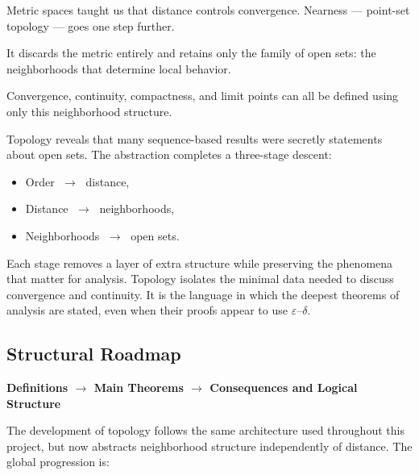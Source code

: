 \begin{tcolorbox}[
  colback=gray!6,
  colframe=gray!40,
  arc=2pt,
  left=8pt, right=8pt, top=6pt, bottom=6pt,
  title={\small\textbf{Structural Role: Nearness — Neighborhood Structure Without Distance}},
  fonttitle=\small\bfseries
]
Metric spaces taught us that distance controls convergence.
Nearness --- point-set topology --- goes one step further.

It discards the metric entirely
and retains only the family of open sets:
the neighborhoods that determine local behavior.

Convergence, continuity, compactness, and limit points
can all be defined using only this neighborhood structure.

Topology reveals that many sequence-based results
were secretly statements about open sets.
The abstraction completes a three-stage descent:

\begin{itemize}
  \item Order $\;\to\;$ distance,
  \item Distance $\;\to\;$ neighborhoods,
  \item Neighborhoods $\;\to\;$ open sets.
\end{itemize}

Each stage removes a layer of extra structure
while preserving the phenomena that matter for analysis.
Topology isolates the minimal data needed to discuss
convergence and continuity.
It is the language in which the deepest theorems of analysis are stated,
even when their proofs appear to use $\varepsilon$--$\delta$.
\end{tcolorbox}
\vspace{1em}

\subsection*{Structural Roadmap}

\begin{center}
\textbf{Definitions $\longrightarrow$ Main Theorems
$\longrightarrow$ Consequences and Logical Structure}
\end{center}

The development of topology follows the same architecture used
throughout this project, but now abstracts neighborhood structure
independently of distance.
The global progression is:

